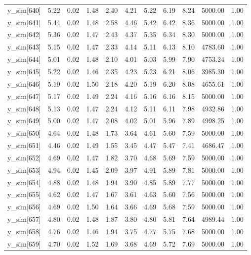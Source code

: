 \begin{table}[ht]
\begin{tabular}{rrrrrrrrrrr}
  y\_sim[640] & 5.22 & 0.02 & 1.48 & 2.40 & 4.21 & 5.22 & 6.19 & 8.24 & 5000.00 & 1.00 \\ 
  y\_sim[641] & 5.44 & 0.02 & 1.48 & 2.58 & 4.46 & 5.42 & 6.42 & 8.36 & 5000.00 & 1.00 \\ 
  y\_sim[642] & 5.36 & 0.02 & 1.47 & 2.43 & 4.37 & 5.35 & 6.34 & 8.30 & 5000.00 & 1.00 \\ 
  y\_sim[643] & 5.15 & 0.02 & 1.47 & 2.33 & 4.14 & 5.11 & 6.13 & 8.10 & 4783.60 & 1.00 \\ 
  y\_sim[644] & 5.01 & 0.02 & 1.48 & 2.10 & 4.01 & 5.03 & 5.99 & 7.90 & 4753.24 & 1.00 \\ 
  y\_sim[645] & 5.22 & 0.02 & 1.46 & 2.35 & 4.23 & 5.23 & 6.21 & 8.06 & 3985.30 & 1.00 \\ 
  y\_sim[646] & 5.19 & 0.02 & 1.50 & 2.18 & 4.20 & 5.19 & 6.20 & 8.08 & 4655.61 & 1.00 \\ 
  y\_sim[647] & 5.17 & 0.02 & 1.49 & 2.24 & 4.16 & 5.16 & 6.16 & 8.15 & 5000.00 & 1.00 \\ 
  y\_sim[648] & 5.13 & 0.02 & 1.47 & 2.24 & 4.12 & 5.11 & 6.11 & 7.98 & 4932.86 & 1.00 \\ 
  y\_sim[649] & 5.00 & 0.02 & 1.47 & 2.08 & 4.02 & 5.01 & 5.96 & 7.89 & 4998.25 & 1.00 \\ 
  y\_sim[650] & 4.64 & 0.02 & 1.48 & 1.73 & 3.64 & 4.61 & 5.60 & 7.59 & 5000.00 & 1.00 \\ 
  y\_sim[651] & 4.46 & 0.02 & 1.49 & 1.55 & 3.45 & 4.47 & 5.47 & 7.41 & 4686.47 & 1.00 \\ 
  y\_sim[652] & 4.69 & 0.02 & 1.47 & 1.82 & 3.70 & 4.68 & 5.69 & 7.59 & 5000.00 & 1.00 \\ 
  y\_sim[653] & 4.94 & 0.02 & 1.45 & 2.09 & 3.97 & 4.91 & 5.89 & 7.81 & 5000.00 & 1.00 \\ 
  y\_sim[654] & 4.88 & 0.02 & 1.48 & 1.94 & 3.90 & 4.85 & 5.89 & 7.77 & 5000.00 & 1.00 \\ 
  y\_sim[655] & 4.62 & 0.02 & 1.47 & 1.67 & 3.61 & 4.63 & 5.60 & 7.56 & 5000.00 & 1.00 \\ 
  y\_sim[656] & 4.69 & 0.02 & 1.50 & 1.64 & 3.66 & 4.69 & 5.68 & 7.59 & 5000.00 & 1.00 \\ 
  y\_sim[657] & 4.80 & 0.02 & 1.48 & 1.87 & 3.80 & 4.80 & 5.81 & 7.64 & 4989.44 & 1.00 \\ 
  y\_sim[658] & 4.76 & 0.02 & 1.46 & 1.94 & 3.75 & 4.77 & 5.75 & 7.68 & 5000.00 & 1.00 \\ 
  y\_sim[659] & 4.70 & 0.02 & 1.52 & 1.69 & 3.68 & 4.69 & 5.72 & 7.69 & 5000.00 & 1.00 \\ 

\end{tabular}
\end{table}
